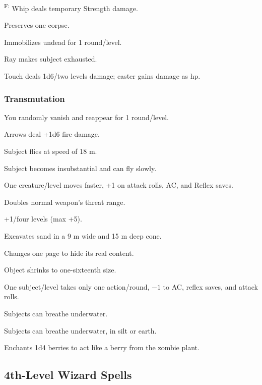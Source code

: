 	\textsuperscript{F:} Whip deals temporary Strength damage. %

	 Preserves one corpse.

	 Immobilizes undead for 1 round/level.

	 Ray makes subject exhausted.

	 Touch deals 1d6/two levels damage; caster gains damage as hp.

\subsubsection{Transmutation}
	 You randomly vanish and reappear for 1 round/level.

	 Arrows deal +1d6 fire damage.

	 Subject flies at speed of 18 m.

	 Subject becomes insubstantial and can fly slowly.

	 One creature/level moves faster, +1 on attack rolls, AC, and Reflex saves.

	 Doubles normal weapon's threat range.

	 +1/four levels (max +5).

	 Excavates sand in a 9 m wide and 15 m deep cone. %

	 Changes one page to hide its real content.

	 Object shrinks to one-sixteenth size.

	 One subject/level takes only one action/round, $-1$ to AC, reflex saves, and attack rolls.

	 Subjects can breathe underwater.

	 Subjects can breathe underwater, in silt or earth. %

	 Enchants 1d4 berries to act like a berry from the zombie plant. %



\subsection{4th-Level Wizard Spells}

